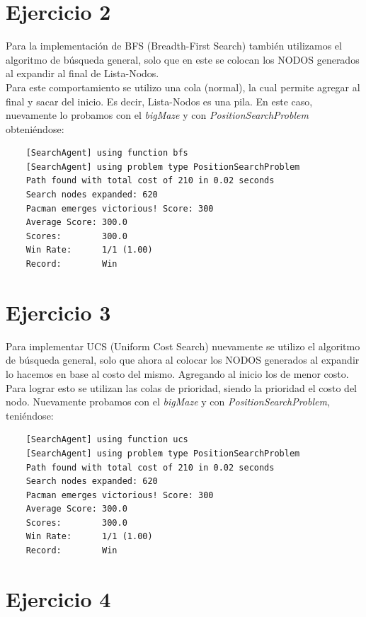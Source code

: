\documentclass[12pt, titlepage, a4paper]{article}
\begin{document}
\section{Ejercicio 2}
Para la implementación de BFS (Breadth-First Search) también utilizamos el 
algoritmo de búsqueda general, solo que en este se colocan los NODOS generados 
al expandir al final de Lista-Nodos.\\

Para este comportamiento se utilizo una cola (normal), la cual permite 
agregar al final y sacar del inicio. Es decir, Lista-Nodos es una pila.
En este caso, nuevamente lo probamos con el \textit{bigMaze} y con \textit{PositionSearchProblem}
 obteniéndose:
\begin{verbatim}
    [SearchAgent] using function bfs
    [SearchAgent] using problem type PositionSearchProblem
    Path found with total cost of 210 in 0.02 seconds
    Search nodes expanded: 620
    Pacman emerges victorious! Score: 300
    Average Score: 300.0
    Scores:        300.0
    Win Rate:      1/1 (1.00)
    Record:        Win
\end{verbatim}



\section{Ejercicio 3}
Para implementar UCS (Uniform Cost Search) nuevamente se utilizo el 
algoritmo de búsqueda general, solo que ahora al colocar los NODOS generados 
al expandir lo hacemos en base al costo del mismo. Agregando al inicio 
los de menor costo.\\

Para lograr esto se utilizan las colas de prioridad, siendo la prioridad 
el costo del nodo. Nuevamente probamos con el \textit{bigMaze} y con \textit{PositionSearchProblem}, 
teniéndose: 
\begin{verbatim}
    [SearchAgent] using function ucs
    [SearchAgent] using problem type PositionSearchProblem
    Path found with total cost of 210 in 0.02 seconds
    Search nodes expanded: 620
    Pacman emerges victorious! Score: 300
    Average Score: 300.0
    Scores:        300.0
    Win Rate:      1/1 (1.00)
    Record:        Win
\end{verbatim}

\section{Ejercicio 4}
\end{document}
